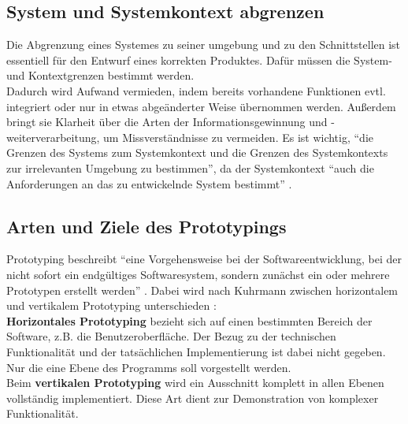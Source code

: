\documentclass [12pt, a4paper, oneside, titlepage, ngerman]{article}
\begin{document}
\subsection{System und Systemkontext abgrenzen}
Die Abgrenzung eines Systemes zu seiner umgebung und zu den Schnittstellen ist essentiell für den Entwurf eines korrekten Produktes. Dafür müssen die System- und Kontextgrenzen bestimmt werden. \\
Dadurch wird Aufwand vermieden, indem bereits vorhandene Funktionen evtl. integriert oder nur in etwas abgeänderter Weise übernommen werden. Außerdem bringt sie Klarheit über die Arten der Informationsgewinnung und -weiterverarbeitung, um Missverständnisse zu vermeiden. Es ist wichtig, "`die Grenzen des Systems zum Systemkontext und die Grenzen des Systemkontexts zur irrelevanten Umgebung zu bestimmen"'\cite[S.20]{PohlRupp2015}, da der Systemkontext "`auch die Anforderungen an das zu entwickelnde System bestimmt"' \cite[S.20]{PohlRupp2015}.

\subsection{Arten und Ziele des Prototypings}
Prototyping beschreibt "`eine Vorgehensweise bei der Softwareentwicklung, bei der nicht sofort ein endgültiges Softwaresystem, sondern zunächst ein oder mehrere Prototypen erstellt werden"' \cite[S.152]{gabler}. Dabei wird nach Kuhrmann zwischen horizontalem und vertikalem Prototyping unterschieden \cite[vgl.][]{Kuhrmann2012}: \\ 
\textbf{Horizontales Prototyping} bezieht sich auf einen bestimmten Bereich der Software, z.B. die Benutzeroberfläche. Der Bezug zu der technischen Funktionalität und der tatsächlichen Implementierung ist dabei nicht gegeben. Nur die eine Ebene des Programms soll vorgestellt werden.\\
Beim \textbf{vertikalen Prototyping} wird ein Ausschnitt komplett in allen Ebenen vollständig implementiert. Diese Art dient zur Demonstration von komplexer Funktionalität.\\
\end{document}
